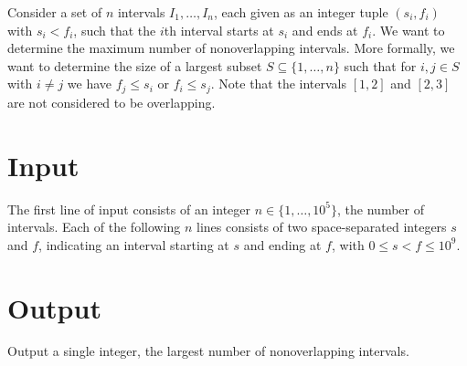 

\noindent
Consider a set of $n$ intervals $I_1,\ldots, I_n$, each given as an integer tuple $(s_i, f_i)$ with $s_i<f_i$, such that the $i$th interval starts at $s_i$ and ends at $f_i$.
We want to determine the maximum number of nonoverlapping intervals.
More formally, we want to determine the size of a largest subset $S\subseteq \{1,\ldots,n\}$ such that for $i, j\in S$ with $i\neq j$ we have $f_j \leq s_i$ or $f_i\leq s_j$. 
Note that the intervals $[1,2]$ and $[2,3]$ are not considered to be overlapping.

\section*{Input}

The first line of input consists of an integer $n\in\{1,\ldots, 10^5\}$, the number of intervals.
Each of the following $n$ lines consists of two space-separated integers $s$ and $f$, indicating an interval starting at $s$ and ending at $f$, with $0\leq s<f\leq 10^9$.


\section*{Output}

Output a single integer, the largest number of nonoverlapping intervals.
